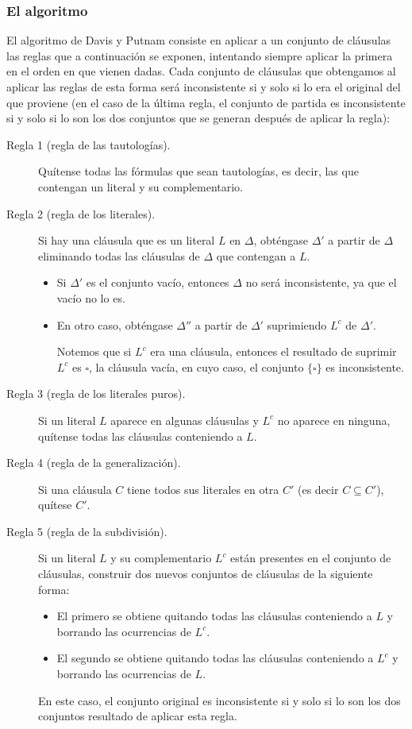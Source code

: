  \subsubsection{El algoritmo}
 El algoritmo de Davis y Putnam consiste en aplicar a un conjunto de cláusulas las reglas que a continuación se exponen, intentando siempre aplicar la primera en el orden en que vienen dadas. Cada conjunto de cláusulas que obtengamos al aplicar las reglas de esta forma será inconsistente si y solo si lo era el original del que proviene (en el caso de la última regla, el conjunto de partida es inconsistente si y solo si lo son los dos conjuntos que se generan después de aplicar la regla):
 \begin{description}
     \item [Regla 1 (regla de las tautologías).] Quítense todas las fórmulas que sean tautologías, es decir, las que contengan un literal y su complementario.
     \item [Regla 2 (regla de los literales).] Si hay una cláusula que es un literal $L$ en $\Delta$, obténgase $\Delta'$ a partir de $\Delta$ eliminando todas las cláusulas de $\Delta$ que contengan a $L$.
         \begin{itemize}
             \item Si $\Delta'$ es el conjunto vacío, entonces $\Delta$ no será inconsistente, ya que el vacío no lo es.
             \item En otro caso, obténgase $\Delta''$ a partir de $\Delta'$ suprimiendo $L^c$ de $\Delta'$.

                 Notemos que si $L^c$ era una cláusula, entonces el resultado de suprimir $L^c$ es $\square$, la cláusula vacía, en cuyo caso, el conjunto $\{\square\}$ es inconsistente.
         \end{itemize}
     \item [Regla 3 (regla de los literales puros).] Si un literal $L$ aparece en algunas cláusulas y $L^c$ no aparece en ninguna, quítense todas las cláusulas conteniendo a $L$.
     \item [Regla 4 (regla de la generalización).] Si una cláusula $C$ tiene todos sus literales en otra $C'$ (es decir $C\subseteq C'$), quítese $C'$.
     \item [Regla 5 (regla de la subdivisión).] Si un literal $L$ y su complementario $L^c$ están presentes en el conjunto de cláusulas, construir dos nuevos conjuntos de cláusulas de la siguiente forma:
         \begin{itemize}
             \item El primero se obtiene quitando todas las cláusulas conteniendo a $L$ y borrando las ocurrencias de $L^c$.
             \item El segundo se obtiene quitando todas las cláusulas conteniendo a $L^c$ y borrando las ocurrencias de $L$.
         \end{itemize}
         En este caso, el conjunto original es inconsistente si y solo si lo son los dos conjuntos resultado de aplicar esta regla.
 \end{description}

